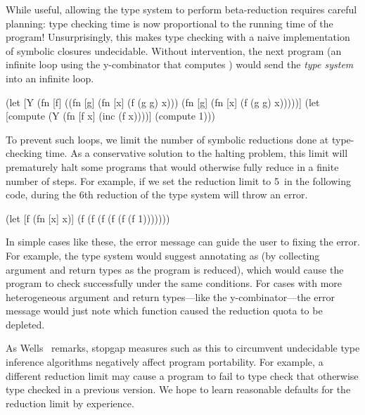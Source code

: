 
While useful, allowing the type system to perform beta-reduction
requires careful planning: type checking time is now proportional 
to the running time of the program!
Unsurprisingly, this makes type checking with a naive implementation of symbolic
closures undecidable.
Without intervention,
the next program (an infinite loop using the y-combinator that computes )
would send the \emph{type system} into an infinite loop.


\begin{cljlisting}
(let [Y (fn [f]
          ((fn [g] (fn [x] (f (g g) x)))
           (fn [g] (fn [x] (f (g g) x)))))]
  (let [compute (Y (fn [f x] (inc (f x))))]
    (compute 1)))
\end{cljlisting}

To prevent such loops, we limit the number of symbolic reductions
done at type-checking time.
As a conservative solution to the halting
problem, this limit will prematurely halt some programs that would
otherwise fully reduce in a finite number of steps.
For example, if we set the reduction limit to 5\ in
the following code,
during the 6th reduction of  the type system will
throw an error.

\begin{cljlisting}
(let [f (fn [x] x)]
  (f (f (f (f (f (f 1)))))))
\end{cljlisting}

In simple cases like these, the error message 
can guide the user to fixing the error.
For example, the type system would suggest 
annotating  as  (by collecting
argument and return types as the program is reduced),
which would cause the program to check successfully
under the same conditions.
For cases with more heterogeneous argument and return types---like the y-combinator---the 
error message would just note which function caused
the reduction quota to be depleted.

As Wells~\cite{wells1994typability} remarks,
stopgap measures such as this to circumvent undecidable
type inference algorithms negatively affect
program portability.
For example, a different reduction limit may cause
a program to fail to type check that otherwise type checked
in a previous version.
We hope to learn reasonable defaults for the reduction limit
by experience.

